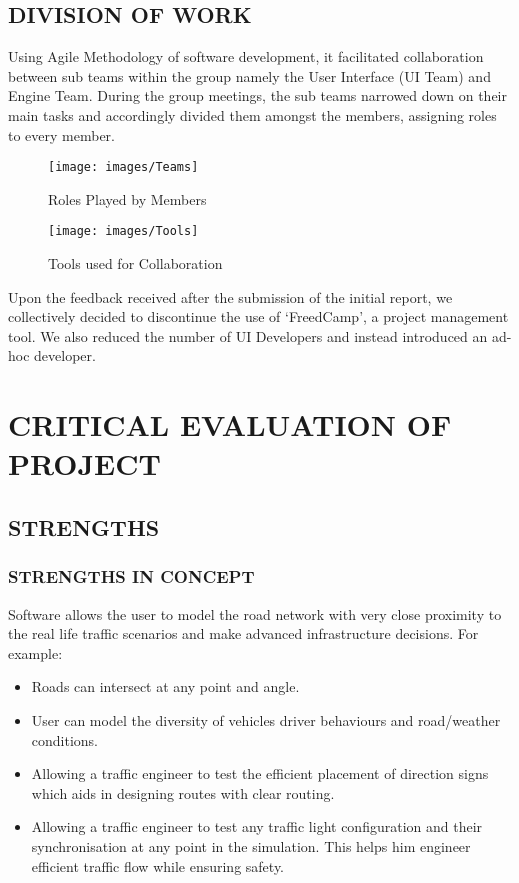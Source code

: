 \documentclass[11pt,a4paper]{article}
\begin{document}
  \subsection{DIVISION OF WORK}
  Using Agile Methodology of software development, it facilitated
  collaboration between sub teams within the group namely the User
  Interface (UI Team) and Engine Team. During the group meetings, the
  sub teams narrowed down on their main tasks and accordingly divided
  them amongst the members, assigning roles to every member.
		
  		\begin{figure}[h!]
			\texttt{[image: images/Teams]}
			\caption{Roles Played by Members}
			\centering
		\end{figure}
		
		\begin{figure}[h!]
			\texttt{[image: images/Tools]}
			\caption{Tools used for Collaboration}
			\centering
		\end{figure}
	\setlength{\parindent}{0cm}
  Upon the feedback received after the submission of the initial
  report, we collectively decided to discontinue the use of
  ‘FreedCamp’, a project management tool. We also reduced the number of
  UI Developers and instead introduced an ad-hoc developer.
  
\section{CRITICAL EVALUATION OF PROJECT}
	\subsection{STRENGTHS}
		\subsubsection{STRENGTHS IN CONCEPT}
		Software allows the user to model the road network with very close proximity to the real life traffic scenarios and make advanced infrastructure decisions. For example:
		
		\begin{itemize}
			\item Roads can intersect at any point and angle.
			\item User can model the diversity of vehicles driver behaviours and road/weather conditions.
			\item Allowing a traffic engineer to test the efficient placement of direction signs which aids in designing routes with clear routing.
			\item Allowing a traffic engineer to test any traffic light configuration and their synchronisation at any point in the simulation. This helps him engineer efficient traffic flow while ensuring safety.
		\end{itemize}
		
\end{document}
